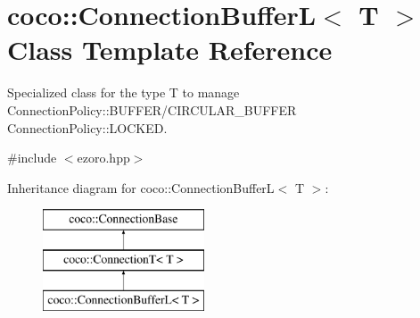 \hypertarget{classcoco_1_1_connection_buffer_l}{\section{coco\-:\-:Connection\-Buffer\-L$<$ T $>$ Class Template Reference}
\label{classcoco_1_1_connection_buffer_l}
}


Specialized class for the type T to manage Connection\-Policy\-::\-B\-U\-F\-F\-E\-R/\-C\-I\-R\-C\-U\-L\-A\-R\-\_\-\-B\-U\-F\-F\-E\-R Connection\-Policy\-::\-L\-O\-C\-K\-E\-D.  




{\ttfamily \#include $<$ezoro.\-hpp$>$}

Inheritance diagram for coco\-:\-:Connection\-Buffer\-L$<$ T $>$\-:\begin{figure}[H]
\begin{center}
\leavevmode
\includegraphics[height=3.000000cm]{classcoco_1_1_connection_buffer_l}
\end{center}
\end{figure}
